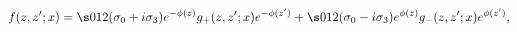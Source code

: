 \begin{equation}
f(z,z';x)=\s012 (\sigma_0+i\sigma_3)e^{-\phi(z)}g_+(z,z';x)e^{-\phi(z')}+
\s012 (\sigma_0-i\sigma_3)e^{\phi(z)}g_-(z,z';x)e^{\phi(z')},
\end{equation}


